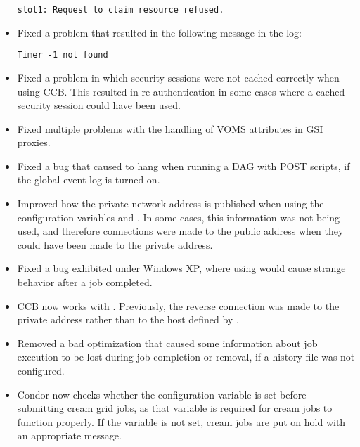 \begin{itemize}
\begin{verbatim}
slot1: Request to claim resource refused.
\end{verbatim}

\item Fixed a problem that resulted in the following message in the
   log:

\begin{verbatim}
Timer -1 not found
\end{verbatim}

\item Fixed a problem in which security sessions were not cached
  correctly when using CCB.  This resulted in re-authentication in
  some cases where a cached security session could have been used.

\item Fixed multiple problems with the handling of VOMS attributes in GSI
proxies.

\item Fixed a bug that caused  to hang when running a
DAG with POST scripts, if the global event log is turned on.

\item Improved how the private network address is published when using
  the configuration variables  and
  .  In some cases, this
  information was not being used, and therefore connections were made
  to the public address when they could have been made to the private
  address.

\item Fixed a bug exhibited under Windows XP,
where using 
would cause strange behavior after a job completed.

\item CCB now works with .  Previously,
  the reverse connection was made to the private address rather than
  to the host defined by .

\item Removed a bad optimization that caused some information about job
execution to be lost during job completion or removal,
if a history file was not configured.

\item Condor now checks whether the configuration variable
 is set before
submitting cream grid jobs, as that variable is required for cream jobs
to function properly. If the variable is not set, cream jobs are put on
hold with an appropriate message.


\end{itemize}
